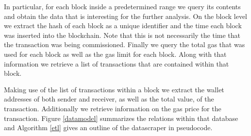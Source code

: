 In particular, for each block inside a predetermined range we query its contents and obtain the data that is interesting for the further analysis. 
On the block level we extract the hash of each block as a unique identifier and the time each block was inserted into the blockchain. 
Note that this is not necessarily the time that the transaction was being commissioned. 
Finally we query the total gas that was used for each block as well as the gas limit for each block. 
Along with that information we retrieve a list of transactions that are contained within that block.

Making use of the list of transactions within a block we extract the wallet addresses of both sender and receiver, as well as the total value, of the transaction. 
Additionally we retrieve information on the gas price for the transaction. 
Figure \ref{datamodel} summarizes the relations within that database and Algorithm \ref{etl} gives an outline of the datascraper in pseudocode.
